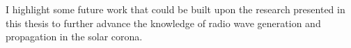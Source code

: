 \begin{abstracts}
I highlight some future work that could be built upon the research presented in this thesis to further advance the knowledge of radio wave generation and propagation in the solar corona.







\end{abstracts}
